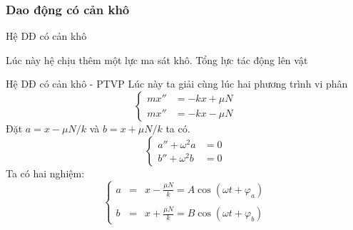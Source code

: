 \subsubsection{Dao động có cản khô}
\begin{frame}{Hệ DĐ có cản khô}
    \begin{center}
        \resizebox{1\linewidth}{!}{}
    \end{center}
    Lúc này hệ chịu thêm một lực ma sát khô. Tổng lực tác động lên vật

\end{frame}
\begin{frame}{Hệ DĐ có cản khô - PTVP}
    Lúc này ta giải cùng lúc hai phương trình vi phân
    \begin{equation}
    \left\{
        \begin{split}
            m x'' &= -kx + \mu N \\
            m x'' &= -kx - \mu N
        \end{split}
    \right.
    \label{eq:2.2_1}
    \end{equation}
    Đặt \(a=x-\mu N/k\) và \(b=x+\mu N/k\) ta có.
    \begin{equation}
    \left\{
        \begin{split}
        a'' + \omega^2 a &= 0 \\
        b'' + \omega^2 b &= 0
        \end{split}
    \right.
    \label{2.2_2}
    \end{equation}
    Ta có hai nghiệm:
    \begin{equation}
    \left\{
        \begin{array}{ccc}
        a &=&\displaystyle x -\frac{\mu N}{k} = A \cos{(\omega t + \varphi_a)} 
        \\
        \\
        b &=&\displaystyle x +\frac{\mu N}{k} = B \cos{(\omega t + \varphi_b)}
        \end{array}
    \right.
    \label{eq:2.2_3}
    \end{equation}
\end{frame}

